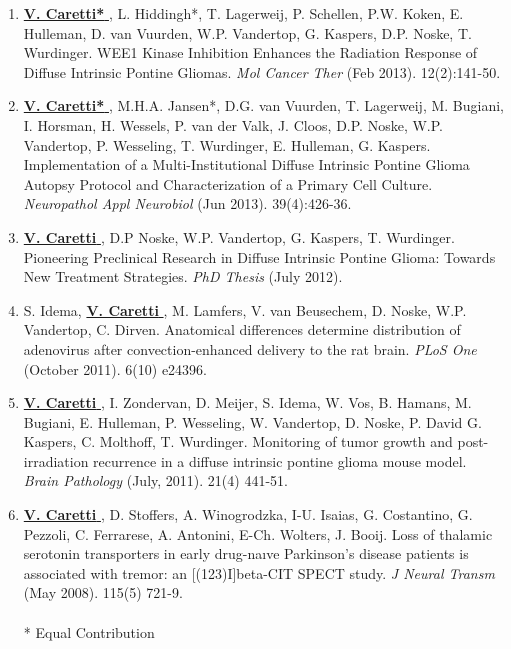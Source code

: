 \documentclass[line,margin]{res}
\newcommand{\namestyle}[1]{\underline{\bf #1 }}
\begin{document}
\begin{resume}
{\begin{enumerate}
\item \namestyle{V. Caretti*}, L. Hiddingh*, T. Lagerweij, P. Schellen, P.W. Koken, E. Hulleman, D. van Vuurden, W.P. Vandertop, G. Kaspers, D.P. Noske, T. Wurdinger. WEE1 Kinase Inhibition Enhances the Radiation Response of Diffuse Intrinsic Pontine Gliomas. \emph{Mol Cancer Ther} (Feb 2013). 12(2):141-50.
\item \namestyle{V. Caretti*}, M.H.A. Jansen*, D.G. van Vuurden, T. Lagerweij, M. Bugiani, I. Horsman, H. Wessels, P. van der Valk, J. Cloos, D.P. Noske, W.P. Vandertop, P. Wesseling, T. Wurdinger, E. Hulleman, G. Kaspers. Implementation of a Multi-Institutional Diffuse Intrinsic Pontine Glioma Autopsy Protocol and Characterization of a Primary Cell Culture. \emph{Neuropathol Appl Neurobiol} (Jun 2013). 39(4):426-36.
\item \namestyle{V. Caretti}, D.P Noske, W.P. Vandertop, G. Kaspers, T. Wurdinger. Pioneering Preclinical Research in Diffuse Intrinsic Pontine Glioma: Towards New Treatment Strategies. \emph{PhD Thesis} (July 2012).
\item S. Idema, \namestyle{V. Caretti}, M. Lamfers, V. van Beusechem, D. Noske, W.P. Vandertop, C. Dirven. Anatomical differences determine distribution of adenovirus after convection-enhanced delivery to the rat brain. \emph{PLoS One} (October 2011). 6(10) e24396.
\item \namestyle{V. Caretti}, I. Zondervan, D. Meijer, S. Idema, W. Vos, B. Hamans, M. Bugiani, E. Hulleman, P. Wesseling, W. Vandertop, D. Noske, P. David G. Kaspers, C. Molthoff, T. Wurdinger. Monitoring of tumor growth and post-irradiation recurrence in a diffuse intrinsic pontine glioma mouse model. \emph{Brain Pathology} (July, 2011). 21(4) 441-51.
\item \namestyle{V. Caretti}, D. Stoffers, A. Winogrodzka, I-U. Isaias, G. Costantino, G. Pezzoli, C. Ferrarese, A. Antonini, E-Ch. Wolters, J. Booij. Loss of thalamic serotonin transporters in early drug-naıve Parkinson’s disease patients is associated with tremor: an [(123)I]beta-CIT SPECT study. \emph{J Neural Transm} (May 2008). 115(5) 721-9.
  \\ \\ {* Equal Contribution}
\end{enumerate}
}


\end{resume}
\end{document}
